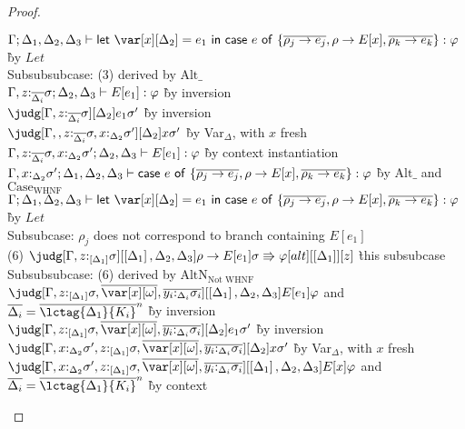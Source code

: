 \begin{proof}
\begin{tabbing}
$\G ; \D_1 , \D_2 , \D_3 \vdash \llet{\x[\D_2] = e_1}{\ccase{e}{\{\overline{\rho_j\to e_j}, \rho \to
           E[x], \overline{\rho_k\to e_k}\}}} : \vp$ \` by
       $\mathit{Let}$\\
       Subsubsubcase: (3) derived by $\textrm{Alt}\_$\\
       $\Gamma , z{:}_{\overline{\Delta_i}} \sigma; \Delta_2,\Delta_3 \vdash E[e_1] : \varphi$ \` by inversion\\
       $\judg[\G , z{:}_{\ov{\Delta_i}} \sigma][\D_2]{e_1}{\sigma'}$
       \` by inversion\\
       $\judg[\G, , z{:}_{\ov{\Delta_i}} \sigma ,x{:}_{\D_2}\sigma'][\D_2]{x}{\sigma'}$ \` by Var$_\Delta$, with $x$ fresh\\
       $\Gamma, z{:}_{\overline{\Delta_i}} \sigma ,x{:}_{\Delta_2}\sigma'; \Delta_2,\Delta_3 \vdash E[e_1] : \varphi$ \` by
       context instantiation\\
       $\Gamma,x{:}_{\Delta_2}\sigma'; \Delta_1,\Delta_2,\Delta_3 \vdash \mathsf{case}~e~\mathsf{of}~\{\overline{\rho_j\to e_j}, \rho \to
  E[x], \overline{\rho_k\to e_k}\} : \varphi$ \` by $\textrm{Alt}\_$ and
$\textrm{Case}_\textrm{WHNF}$\\
       $\G ; \D_1 , \D_2 , \D_3 \vdash \llet{\x[\D_2] = e_1}{\ccase{e}{\{\overline{\rho_j\to e_j}, \rho \to
           E[x], \overline{\rho_k\to e_k}\}}} : \vp$ \` by
       $\mathit{Let}$\\
       Subsubcase: $\rho_j$ does not correspond to branch containing
       $E[e_1]$\\
       (6) $\judg[\G,z{:}_{\irr{\D_1}}\s][\irr{\D_1},\D_2,\D_3]{\rho\to E[e_1]}{\s
         \Rrightarrow \vp}[alt][\irr{\D_1}][z]$ \` this subsubcase\\
       Subsubsubcase: (6) derived by $\textrm{AltN}_{\textrm{Not
           WHNF}}$\\
       $\judg[\G, z{:}_{\irr{\D_1}}\s,\ov{\xo},\ov{y_i{:}_{\D_i}\s_i}][\irr{\D_1},\D_2,\D_3]{E[e_1]}{\vp}$
       and $\ov{\D_i} = \ov{\lctag{\D_1}{K_i}}^n$ \` by inversion\\
       $\judg[\G,
       z{:}_{\irr{\D_1}}\s,\ov{\xo},\ov{y_i{:}_{\D_i}\s_i}][\D_2]{e_1}{\sigma'}$
       \` by inversion\\
       $\judg[\G,x{:}_{\D_2}\sigma',
       z{:}_{\irr{\D_1}}\s,\ov{\xo},\ov{y_i{:}_{\D_i}\s_i}][\D_2]{x}{\sigma'}$
       \` by Var$_\Delta$, with $x$ fresh\\
       $\judg[\G, x{:}_{\D_2}\sigma', z{:}_{\irr{\D_1}}\s,\ov{\xo},\ov{y_i{:}_{\D_i}\s_i}][\irr{\D_1},\D_2,\D_3]{E[x]}{\vp}$
       and $\ov{\D_i} = \ov{\lctag{\D_1}{K_i}}^n$ \` by context

\end{tabbing}
\end{proof}
